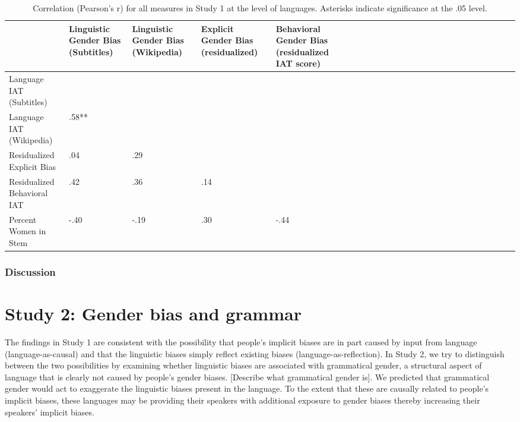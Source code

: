 \documentclass[man,floatsintext]{apa6}
\theoremstyle{definition}
\theoremstyle{definition}
\theoremstyle{definition}
\theoremstyle{remark}
\begin{document}
\begin{table}

\caption{\label{tab:corrtable}Correlation (Pearson's r) for all measures in Study 1 at the level of languages. Asterisks indicate significance at the .05 level.}
\centering
\fontsize{10}{12}\selectfont
\begin{tabular}[t]{l>{\raggedleft\arraybackslash}p{2.5cm}>{\raggedleft\arraybackslash}p{2.5cm}>{\raggedleft\arraybackslash}p{2.5cm}>{\raggedleft\arraybackslash}p{2.5cm}lrrrrlrrrrlrrrrlrrrr}
\toprule
 & Linguistic Gender Bias 
(Subtitles) & Linguistic Gender Bias 
 (Wikipedia) & Explicit Gender Bias 
 (residualized) & Behavioral Gender Bias (residualized IAT score)\\
\midrule
Language IAT (Subtitles) &  &  &  & \\
Language IAT (Wikipedia) & .58** &  &  & \\
Residualized Explicit Bias & .04 & .29 &  & \\
Residualized Behavioral IAT & .42 & .36 & .14 & \\
Percent Women in Stem & -.40 & -.19 & .30 & -.44\\
\bottomrule
\end{tabular}
\end{table}

\subsubsection{Discussion}\label{discussion}

\section{Study 2: Gender bias and
grammar}\label{study-2-gender-bias-and-grammar}

The findings in Study 1 are consistent with the possibility that
people's implicit biases are in part caused by input from language
(language-as-causal) and that the linguistic biases simply reflect
existing biases (language-as-reflection). In Study 2, we try to
distinguish between the two possibilities by examining whether
linguistic biases are associated with grammatical gender, a structural
aspect of language that is clearly not caused by people's gender biases.
{[}Describe what grammatical gender is{]}. We predicted that grammatical
gender would act to exaggerate the linguistic biases present in the
language. To the extent that these are causally related to people's
implicit biases, these languages may be providing their speakers with
additional exposure to gender biases thereby increasing their speakers'
implicit biases.
\end{document}
